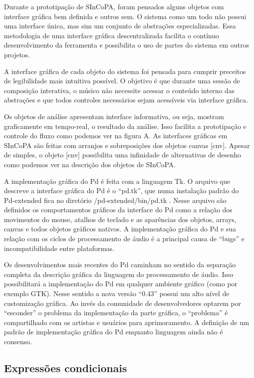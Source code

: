 \documentclass{ppgmus}
\begin{document}
Durante a prototipação de SInCoPA, foram pensados
alguns objetos com interface gráfica bem definida e outros
sem. O sistema como um todo não possui uma interface única, mas
sim um conjunto de abstrações especializadas. Essa metodologia
de uma interface gráfica descentralizada facilita o contínuo
desenvolvimento da ferramenta e possibilita o uso de partes do
sistema em outros projetos.

A interface gráfica de cada objeto do sistema foi pensada para cumprir
preceitos de legibilidade mais intuitiva possível. O
objetivo é que durante uma sessão de composição interativa, o
músico não necessite acessar o conteúdo interno das abstrações e 
que todos controles necessários sejam acessíveis via interface gráfica. 

Os objetos de análise apresentam interface informativa, ou seja, 
mostram graficamente em tempo-real, o resultado da análise. Isso facilita
a prototipação e controle do fluxo como podemos ver  na figura A.
As interfaces gráficas em SInCoPA são feitas com arranjos e sobreposições
dos objetos canvas [cnv]. Apesar de simples, o objeto [cnv] possibilita
uma infinidade de alternativas de desenho como podemos ver na descrição
dos objetos de SInCoPA.

A implementação gráfica do Pd é feita com a linguagem Tk. O arquivo
que descreve a interface gráfica do Pd é o ``pd.tk'', que numa instalação
padrão do Pd-extended fica no diretório /pd-extended/bin/pd.tk .
Nesse arquivo são definidos os comportamentos gráficos da interface do Pd como
a relação dos movimentos do mouse, atalhos de teclado e as aparências dos
objetos, arrays, canvas e todos objetos gráficos nativos.
A implementação gráfica do Pd e sua relação com os ciclos de processamento
de áudio é a principal causa de ``bugs'' e incompatibilidade entre plataformas.

Os desenvolvimentos mais recentes do Pd caminham no sentido da separação
completa da descrição gráfica da linguagem do processamento de áudio. 
Isso possibilitará a implementação do Pd em qualquer ambiente gráfico (como
por exemplo GTK).
Nesse sentido a nova versão ``0.43'' possui um alto nível de customização gráfica.
Ao invés da comunidade de desenvolvedores optarem por ``esconder'' o problema
da implementação da parte gráfica, o ``problema'' é compartilhado com os
artistas e usuários para aprimoramento. A definição de um padrão de implementação
gráfica do Pd enquanto linguagem ainda não é consenso.

\subsection{Expressões condicionais}
\end{document}
